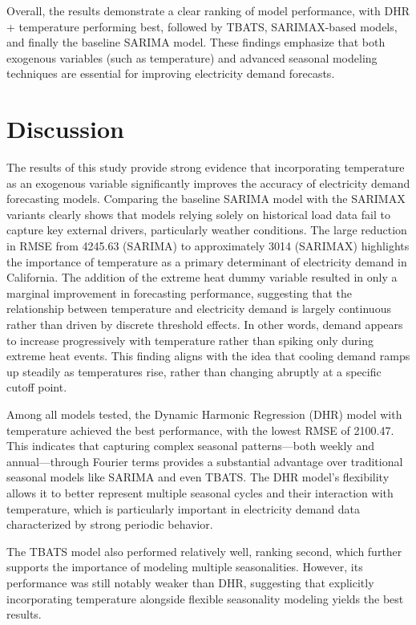 \documentclass[
]{article}
\begin{document}
Overall, the results demonstrate a clear ranking of model performance,
with DHR + temperature performing best, followed by TBATS, SARIMAX-based
models, and finally the baseline SARIMA model. These findings emphasize
that both exogenous variables (such as temperature) and advanced
seasonal modeling techniques are essential for improving electricity
demand forecasts.

\section{Discussion}\label{discussion}

The results of this study provide strong evidence that incorporating
temperature as an exogenous variable significantly improves the accuracy
of electricity demand forecasting models. Comparing the baseline SARIMA
model with the SARIMAX variants clearly shows that models relying solely
on historical load data fail to capture key external drivers,
particularly weather conditions. The large reduction in RMSE from
4245.63 (SARIMA) to approximately 3014 (SARIMAX) highlights the
importance of temperature as a primary determinant of electricity demand
in California. The addition of the extreme heat dummy variable resulted
in only a marginal improvement in forecasting performance, suggesting
that the relationship between temperature and electricity demand is
largely continuous rather than driven by discrete threshold effects. In
other words, demand appears to increase progressively with temperature
rather than spiking only during extreme heat events. This finding aligns
with the idea that cooling demand ramps up steadily as temperatures
rise, rather than changing abruptly at a specific cutoff point.

Among all models tested, the Dynamic Harmonic Regression (DHR) model
with temperature achieved the best performance, with the lowest RMSE of
2100.47. This indicates that capturing complex seasonal patterns---both
weekly and annual---through Fourier terms provides a substantial
advantage over traditional seasonal models like SARIMA and even TBATS.
The DHR model's flexibility allows it to better represent multiple
seasonal cycles and their interaction with temperature, which is
particularly important in electricity demand data characterized by
strong periodic behavior.

The TBATS model also performed relatively well, ranking second, which
further supports the importance of modeling multiple seasonalities.
However, its performance was still notably weaker than DHR, suggesting
that explicitly incorporating temperature alongside flexible seasonality
modeling yields the best results.
\end{document}

